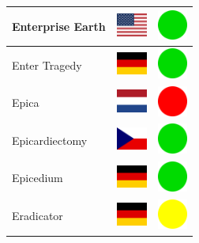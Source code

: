 \documentclass[12pt, a4paper, twoside]{report}
\begin{document}
\begin{center}
\begin{longtable}{|p{5cm}|p{2cm}|p{2cm}|}
 Enterprise Earth                                           & \includegraphics[width=1cm]{4x3/us} &   \includegraphics[width=1cm]{likes/y} \\ \hline
 Enter Tragedy                                              & \includegraphics[width=1cm]{4x3/de} &   \includegraphics[width=1cm]{likes/y} \\ \hline
 Epica                                                      & \includegraphics[width=1cm]{4x3/nl} &   \includegraphics[width=1cm]{likes/n} \\ \hline
 Epicardiectomy                                             & \includegraphics[width=1cm]{4x3/cz} &   \includegraphics[width=1cm]{likes/y} \\ \hline
 Epicedium                                                  & \includegraphics[width=1cm]{4x3/de} &   \includegraphics[width=1cm]{likes/y} \\ \hline
 Eradicator                                                 & \includegraphics[width=1cm]{4x3/de} &   \includegraphics[width=1cm]{likes/m} \\ \hline

\end{longtable}
\end{center}
\end{document}
